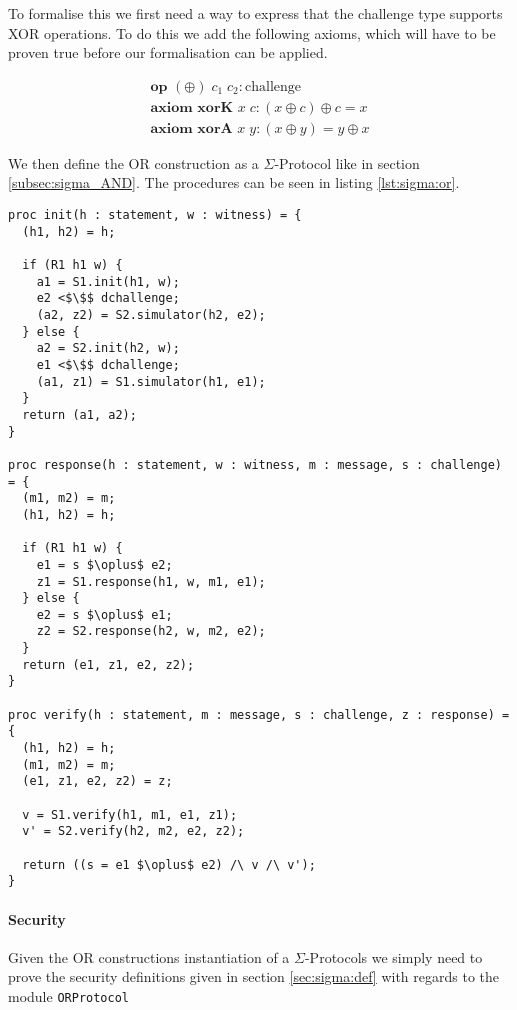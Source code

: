 To formalise this we first need a way to express that the challenge type
supports XOR operations. To do this we add the following axioms, which will have
to be proven true before our formalisation can be applied.

\begin{gather}
  \textbf{op } (\oplus) \; c_{1} \; c_{2} : \text{challenge} \label{def:op:xor} \\
  \textbf{axiom xorK } x \; c : (x \oplus c) \oplus c = x \label{axiom:xorK} \\
  \textbf{axiom xorA } x \; y : (x \oplus y) = y \oplus x \label{axiom:xorA}
\end{gather}


We then define the OR construction as a $\Sigma$-Protocol like in section
\ref{subsec:sigma_AND}. The procedures can be seen in listing \ref{lst:sigma:or}.

\begin{lstlisting}[float, mathescape, label=lst:sigma:or,caption=OR construction]
proc init(h : statement, w : witness) = {
  (h1, h2) = h;

  if (R1 h1 w) {
    a1 = S1.init(h1, w);
    e2 <$\$$ dchallenge;
    (a2, z2) = S2.simulator(h2, e2);
  } else {
    a2 = S2.init(h2, w);
    e1 <$\$$ dchallenge;
    (a1, z1) = S1.simulator(h1, e1);
  }
  return (a1, a2);
}

proc response(h : statement, w : witness, m : message, s : challenge) = {
  (m1, m2) = m;
  (h1, h2) = h;

  if (R1 h1 w) {
    e1 = s $\oplus$ e2;
    z1 = S1.response(h1, w, m1, e1);
  } else {
    e2 = s $\oplus$ e1;
    z2 = S2.response(h2, w, m2, e2);
  }
  return (e1, z1, e2, z2);
}

proc verify(h : statement, m : message, s : challenge, z : response) = {
  (h1, h2) = h;
  (m1, m2) = m;
  (e1, z1, e2, z2) = z;

  v = S1.verify(h1, m1, e1, z1);
  v' = S2.verify(h2, m2, e2, z2);

  return ((s = e1 $\oplus$ e2) /\ v /\ v');
}
\end{lstlisting}


\paragraph{Security}
Given the OR constructions instantiation of a $\Sigma$-Protocols we simply need
to prove the security definitions given in section \ref{sec:sigma:def} with
regards to the module \texttt{ORProtocol}

